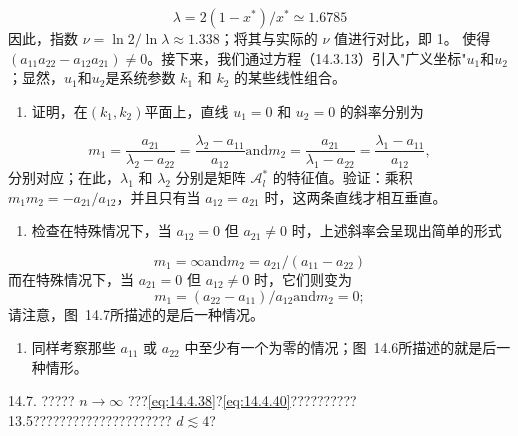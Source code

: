 \begin{equation}\tag{14.4.116}\label{eq:14.4.116}
\lambda = 2 ( 1 - x ^{*} ) / x ^{*} \simeq 1 . 67 85
\end{equation}
因此，指数 \(\nu = \ln 2 / \ln \lambda \approx 1.338\)；将其与实际的 \(\nu\) 值进行对比，即 1。
使得 \((a_{11}a_{22}-a_{12}a_{21})\neq0\)。接下来，我们通过方程（14.3.13）引入"广义坐标"\(u_{1}\)和\(u_{2}\)；显然，\(u_{1}\)和\(u_{2}\)是系统参数 \(k_{1}\) 和 \(k_{2}\) 的某些线性组合。
\begin{enumerate}
\def\labelenumi{(\alph{enumi})}
\item
  证明，在\((k_{1},k_{2})\)平面上，直线 \(u_{1}=0\) 和 \(u_{2}=0\) 的斜率分别为
\end{enumerate}
\begin{equation}\tag{14.4.117}\label{eq:14.4.117}
m _ { 1 } = \frac { a _ { 21 } } { \lambda _ { 2 } - a _ { 22 } } = \frac { \lambda _ { 2 } - a _ { 11 } } { a _ { 12 } }  \mathrm { a n d }  m _ { 2 } = \frac { a _ { 21 } } { \lambda _ { 1 } - a _ { 22 } } = \frac { \lambda _ { 1 } - a _ { 11 } } { a _ { 12 } } ,
\end{equation}
分别对应；在此，\(\lambda_{1}\) 和 \(\lambda_{2}\) 分别是矩阵 \(\mathcal{A}_{l}^{*}\) 的特征值。验证：乘积 \(m_{1}m_{2}=-a_{21}/a_{12}\)，并且只有当 \(a_{12}=a_{21}\) 时，这两条直线才相互垂直。
\begin{enumerate}
\def\labelenumi{(\alph{enumi})}
\setcounter{enumi}{1}
\item
  检查在特殊情况下，当 \(a_{12}=0\) 但 \(a_{21}\neq0\) 时，上述斜率会呈现出简单的形式
\end{enumerate}
\begin{equation}\tag{14.4.118}\label{eq:14.4.118}
m _ { 1 } = \infty  \mathrm { a n d }  m _ { 2 } = a _ { 21 } / \left( a _ { 11 } - a _ { 22 } \right)
\end{equation}
而在特殊情况下，当 \(a_{21}=0\) 但 \(a_{12}\neq0\) 时，它们则变为
\begin{equation}\tag{14.4.119}\label{eq:14.4.119}
m _ { 1 } = ( a _ { 22 } - a _ { 11 } ) / a _ { 12 }  \mathrm { a n d }  m _ { 2 } = 0 ;
\end{equation}
请注意，图~14.7所描述的是后一种情况。
\begin{enumerate}
\def\labelenumi{(\alph{enumi})}
\setcounter{enumi}{2}
\item
  同样考察那些 \(a_{11}\) 或 \(a_{22}\) 中至少有一个为零的情况；图~14.6所描述的就是后一种情形。
\end{enumerate}
14.7. ????? \(n \to \infty\) ???\autoref{eq:14.4.38}?\autoref{eq:14.4.40}??????????13.5????????????????????? \(d \lesssim 4\)?

